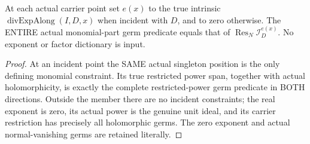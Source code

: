 \begin{lemma}
\label{hir:sharp-actual-single-exceptional-monomial-power-dictionary}
\leanok
At each actual carrier point set $e(x)$ to the true intrinsic
$\operatorname{divExpAlong}(I,D,x)$ when incident with $D$, and to zero
otherwise. The ENTIRE actual monomial-part germ predicate equals that of
$\operatorname{Res}_N\mathcal I_D^{e(x)}$. No exponent or factor dictionary
is input.
\end{lemma}
\begin{proof}
At an incident point the SAME actual singleton position is the only defining
monomial constraint. Its true restricted power span, together with actual
holomorphicity, is exactly the complete restricted-power germ predicate in
BOTH directions. Outside the member there are no incident constraints; the
real exponent is zero, its actual power is the genuine unit ideal, and its
carrier restriction has precisely all holomorphic germs. The zero exponent
and actual normal-vanishing germs are retained literally.
\end{proof}

